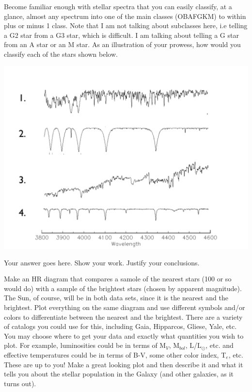 \documentclass[12pt]{article}
\newenvironment{problem}[2][Problem]{\begin{trivlist}
\item[\hskip \labelsep {\bfseries #1}\hskip \labelsep {\bfseries #2.}]}{\end{trivlist}}
\newenvironment{answer}[2][Answer]{\begin{trivlist}
\item[\hskip \labelsep {\bfseries #1}\hskip \labelsep {\bfseries #2.}]}{\end{trivlist}}
\begin{document}
\begin{problem}{2} Become familiar enough with stellar spectra that you can easily classify, at a glance, almost any spectrum into one of the main classes (OBAFGKM) to within plus or minus 1 class. Note that I am not talking about subclasses here, i.e telling a G2 star from a G3 star, which is difficult. I am talking about telling a G star from an A star or an M star. As an illustration of your prowess, how would you classify each of the stars shown below.

\includegraphics [scale=0.3] {UnknownSpectra.pdf}

\end{problem}

\begin{answer}{2}
Your answer goes here. Show your work. Justify your conclusions.
\end{answer}
 
\begin{problem}{3} Make an HR diagram that compares a samole of the nearest stars (100 or so would do) with a sample of the brightest stars (chosen by apparent magnitude). The Sun, of course, will be in both data sets, since it is the nearest and the brightest. Plot everything on the same diagram and use different symbols and/or colors to differentiate between the nearest and the brightest. There are a variety of catalogs you could use for this, including Gaia, Hipparcos, Gliese, Yale, etc. You may choose where to get your data and exactly what quantities you wish to plot. For example, luminosities could be in terms of M$_V$, M$_{bol}$, L/L$_\odot$, etc. and effective temperatures could be in terms of B-V, some other color index, T$_e$, etc. These are up to you! Make a great looking plot and then describe it and what it tells you about the stellar population in the Galaxy (and other galaxies, as it turns out).

\end{problem}
\end{document}
